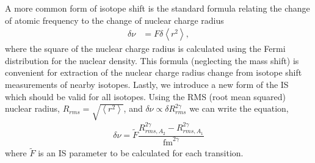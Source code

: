 \documentclass[10pt,a4paper, twoside]{report}
\begin{document}
 A more common form of isotope shift is the standard formula relating the change of atomic frequency to the change of nuclear charge radius
\begin{align} \label{eq:isoF}
\delta \nu &= F\delta \left<r^{2}\right>,
\end{align}
where the square of the nuclear charge radius is calculated using the Fermi distribution for the nuclear density. This formula (neglecting the mass shift) is convenient for extraction of the nuclear charge radius change from isotope shift measurements of nearby isotopes. Lastly, we introduce a new form of the IS which should be valid for all isotopes. Using  the RMS (root mean squared) nuclear radius, $ R_{rms} = \sqrt{\left<r^{2}\right>}$,  and $\delta \nu \propto \delta R_{rms}^{2\gamma}$ \cite{FGV2018} we can write the equation,
\begin{align}\label{eq:isoFtilde}
\delta \nu = \tilde{F}\dfrac{R_{rms,A_2}^{2\gamma} - R_{rms,A_1}^{2\gamma}}{\text{fm}^{2\gamma}}
\end{align}
where $\tilde{F}$ is an IS parameter to be calculated for each transition.
\end{document}
